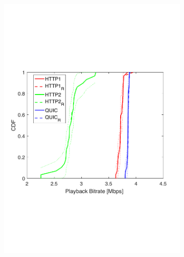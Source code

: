 \begin{figure}[t!]
\centering
\begin{subfigure}[t]{0.33\textwidth}
   \captionsetup{justification=centering,margin=4.5cm}
    \includegraphics[trim={0 7cm 0 7cm}, scale=0.25]{figures/CDF_bitrat_squad_mixed_clients_nd18.pdf}
     \caption{}
    \label{fig:pmixedbitrate}
  \end{subfigure}
  \begin{subfigure}[t]{0.33\textwidth}
  \captionsetup{justification=raggedright,singlelinecheck=false,margin=2.5cm}

\end{subfigure}
\end{figure}
